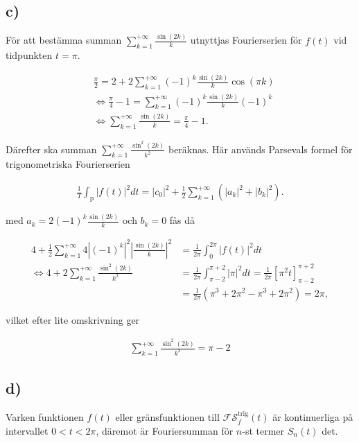 \documentclass[a4paper]{article}
\begin{document}
\FloatBarrier

\subsection*{c)}

För att bestämma summan $\sum_{k=1}^{+\infty}\frac{\sin(2k)}{k}$ utnyttjas
Fourierserien för $f(t)$ vid tidpunkten $t = \pi$.

\begin{align*}
  &\frac{\pi}{2} = 2 + 2\sum_{k=1}^{+\infty}(-1)^k\frac{\sin(2k)}{k}\cos(\pi k)\\
  &\iff \frac{\pi}{4} - 1 = \sum_{k=1}^{+\infty}(-1)^k\frac{\sin(2k)}{k}(-1)^k\\
  &\iff \sum_{k=1}^{+\infty}\frac{\sin(2k)}{k} = \frac{\pi}{4} - 1.
\end{align*}

\noindent Därefter ska summan $\sum_{k=1}^{+\infty}\frac{\sin^2(2k)}{k^2}$ beräknas. Här
används Parsevals formel för trigonometriska Fourierserien

\begin{align*}
  \frac{1}{T}\int_{\text{p}}\left| f(t) \right|^2 dt = |c_0|^2 + \frac{1}{2} \sum_{k=1}^{+\infty} \left( |a_k|^2 + |b_k|^2\right).
\end{align*}

\noindent med $a_k = 2(-1)^k\frac{\sin(2k)}{k}$ och $b_k = 0$ fås då

\begin{align*}
  4 + \frac{1}{2}\sum_{k=1}^{+\infty}4\left| (-1)^k\right|^2\left|\frac{\sin(2k)}{k}\right|^2 &= \frac{1}{2\pi}\int_0^{2\pi}|f(t)|^2dt\\
  \iff 4 + 2\sum_{k=1}^{+\infty}\frac{\sin^2(2k)}{k^2} &= \frac{1}{2\pi}\int_{\pi-2}^{\pi+2}|\pi|^2dt = \frac{1}{2\pi}\left[\pi^2t\right]_{\pi-2}^{\pi+2}\\
  &=\frac{1}{2\pi}\left(\pi^3 + 2\pi^2 - \pi^3 + 2\pi^2\right) = 2\pi,
\end{align*}

\noindent vilket efter lite omskrivning ger

\begin{align*}
  \sum_{k=1}^{+\infty}\frac{\sin^2(2k)}{k^2} = \pi - 2
\end{align*}

\subsection*{d)}

Varken funktionen $f(t)$ eller gränsfunktionen till $\mathcal{FS}_f^{\text{trig}}(t)$ är kontinuerliga på intervallet $0 < t < 2\pi$, däremot är Fouriersumman för $n$-st termer $S_n(t)$ det. 
\end{document}
